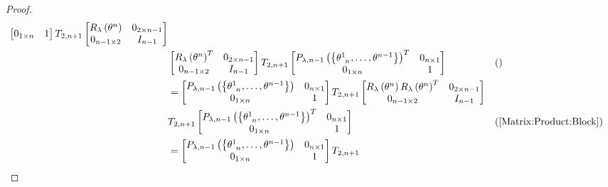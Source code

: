 \documentclass[../main.tex]{subfiles}
\begin{document}
\begin{proof}
\begin{align*}
\begin{bmatrix}
0_{1\times n}&1\\
\end{bmatrix}
T_{2,n+1}
\begin{bmatrix}
R_\lambda\left(\tensor{\theta}{^n}\right)&0_{{2}\times{n-1}}\\
0_{{n-1}\times{2}}&{I}_{n-1}\\
\end{bmatrix}\\
&
\begin{bmatrix}
R_\lambda\left(\tensor{\theta}{^n}\right)^T&0_{{2}\times{n-1}}\\
0_{{n-1}\times{2}}&{I}_{n-1}\\
\end{bmatrix}
T_{2,n+1}
\begin{bmatrix}
P_{\lambda,n-1}\left(\left\{\tensor{\theta}{^1_{n}},\dots,\tensor{\theta}{^{n-1}}\right\}\right)^T&0_{n\times 1}\\
0_{1\times n}&1\\
\end{bmatrix}
&&\text{()}\\
&=
\begin{bmatrix}
P_{\lambda,n-1}\left(\left\{\tensor{\theta}{^1_{n}},\dots,\tensor{\theta}{^{n-1}}\right\}\right)&0_{n\times 1}\\
0_{1\times n}&1\\
\end{bmatrix}
T_{2,n+1}
\begin{bmatrix}
R_\lambda\left(\tensor{\theta}{^n}\right)R_\lambda\left(\tensor{\theta}{^n}\right)^T&0_{{2}\times{n-1}}\\
0_{{n-1}\times{2}}&{I}_{n-1}\\
\end{bmatrix}\\
&
T_{2,n+1}
\begin{bmatrix}
P_{\lambda,n-1}\left(\left\{\tensor{\theta}{^1_{n}},\dots,\tensor{\theta}{^{n-1}}\right\}\right)^T&0_{n\times 1}\\
0_{1\times n}&1\\
\end{bmatrix}&&\text{(\cref{Matrix:Product:Block})}\\
&=
\begin{bmatrix}
P_{\lambda,n-1}\left(\left\{\tensor{\theta}{^1_{n}},\dots,\tensor{\theta}{^{n-1}}\right\}\right)&0_{n\times 1}\\
0_{1\times n}&1\\
\end{bmatrix}
T_{2,n+1}\\

\end{align*}
\end{proof}
\end{document}

